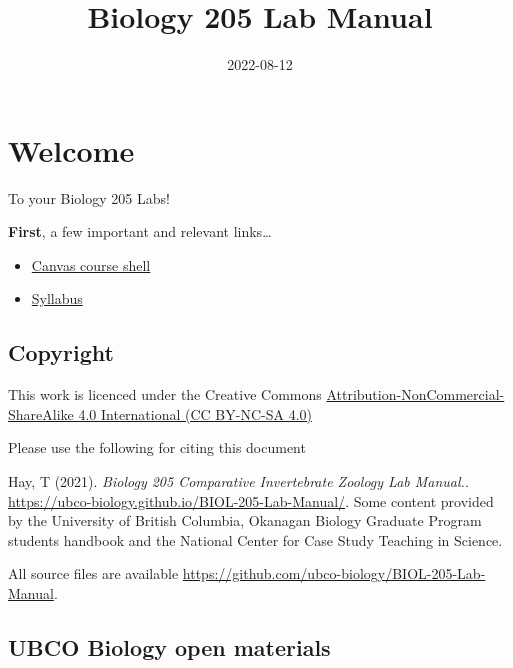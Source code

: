 \documentclass[
]{book}
\title{Biology 205 Lab Manual}
\author{}
\date{\vspace{-2.5em}2022-08-12}
\providecommand{\tightlist}{%
  \setlength{\itemsep}{0pt}\setlength{\parskip}{0pt}}
\begin{document}
\maketitle

{
\setcounter{tocdepth}{1}
\tableofcontents
}
\hypertarget{welcome}{%
\chapter*{Welcome}\label{welcome}}

To your Biology 205 Labs!

\textbf{First}, a few important and relevant links\ldots{}

\begin{itemize}
\tightlist
\item
  \href{https://canvas.ubc.ca/courses/113910}{Canvas course shell}
\item
  \href{https://canvas.ubc.ca/courses/113910/files/21718741?module_item_id=4662232}{Syllabus}
\end{itemize}

\hypertarget{copyright}{%
\section*{Copyright}\label{copyright}}

This work is licenced under the Creative Commons \href{https://creativecommons.org/licenses/by-nc-sa/4.0/}{Attribution-NonCommercial-ShareAlike 4.0 International (CC BY-NC-SA 4.0)}

Please use the following for citing this document

Hay, T (2021). \emph{Biology 205 Comparative Invertebrate Zoology Lab Manual.}. \url{https://ubco-biology.github.io/BIOL-205-Lab-Manual/}. Some content provided by the University of British Columbia, Okanagan Biology Graduate Program students handbook and the National Center for Case Study Teaching in Science.

All source files are available \url{https://github.com/ubco-biology/BIOL-205-Lab-Manual}.

\hypertarget{ubco-biology-open-materials}{%
\section*{UBCO Biology open materials}\label{ubco-biology-open-materials}}
\end{document}
